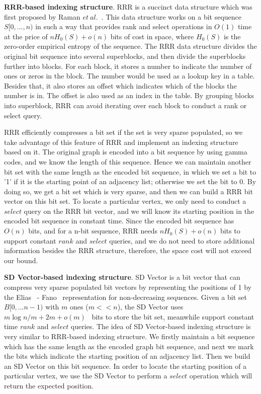 \documentclass[12pt,glossary]{dalthesis}
\begin{document}
\bigskip
\bigskip

\textbf{RRR-based indexing structure}. RRR is a succinct data structure which was first proposed by Raman $et \ al$.~\cite{RRR}. This data structure works on a bit sequence $S[0,...,n)$ in such a way that provides rank and select operations in $O(1)$ time at the price of $nH_{0}(S)+o(n)$ bits of cost in space, where $H_{0}(S)$ is the zero-order empirical entropy of the sequence. The RRR data structure divides the original bit sequence into several superblocks, and then divide the superblocks further into blocks. For each block, it stores a number to indicate the number of ones or zeros in the block. The number would be used as a lookup key in a table. Besides that, it also stores an offset which indicates which of the blocks the number is in. The offset is also used as an index in the table. By grouping blocks into superblock, RRR can avoid iterating over each block to conduct a rank or select query. 

\bigskip
\bigskip

RRR efficiently compresses a bit set if the set is very sparse populated, so we take advantage of this feature of RRR and implement an indexing structure based on it. The original graph is encoded into a bit sequence by using gamma codes, and we know the length of this sequence. Hence we can maintain another bit set with the same length as the encoded bit sequence, in which we set a bit to '1' if it is the starting point of an adjacency list; otherwise we set the bit to 0. By doing so, we get a bit set which is very sparse, and then we can build a RRR bit vector on this bit set. To locate a particular vertex, we only need to conduct a $select$ query on the RRR bit vector, and we will know its starting position in the encoded bit sequence in constant time. Since the encoded bit sequence has $O(n)$ bits, and for a n-bit sequence, RRR needs $nH_{0}(S)+o(n)$ bits to support constant $rank$ and $select$ queries, and we do not need to store additional information besides the RRR structure, therefore, the space cost will not exceed our bound. 

\bigskip
\bigskip

\textbf{SD Vector-based indexing structure}. SD Vector is a bit vector that can compress very sparse populated bit vectors by representing the positions of 1 by the Elias~\cite{Elias} - Fano~\cite{Fano} representation for non-decreasing sequences. Given a bit set $B[0,...n-1)$ with $m$ ones ($m << n$),   the SD Vector uses $m \log n/m  + 2m + o(m)$~\cite{Practical-Entropy} bits to store the bit set, meanwhile support constant time $rank$ and $select$ queries. The idea of SD Vector-based indexing structure is very similar to RRR-based indexing structure. We firstly maintain a bit sequence which has the same length as the encoded graph bit sequence, and next we mark the bits which indicate the starting position of an adjacency list. Then we build an SD Vector on this bit sequence. In order to locate the starting position of a particular vertex, we use the SD Vector to perform a $select$ operation which will return the expected position. 
\end{document}
